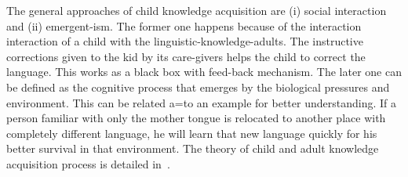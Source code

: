 \documentclass{bmcart}
\begin{document}
The general approaches of child knowledge acquisition are (i) social interaction and (ii) emergent-ism. The former one happens because of the interaction interaction of a child with the linguistic-knowledge-adults. The instructive corrections given to the kid by its care-givers helps the child to correct the language. This works as a black box with feed-back mechanism. The later one can be defined as the cognitive process that emerges by the biological pressures and environment. This can be related a=to an example for better understanding. If a person familiar with only the mother tongue is relocated to another place with completely different language, he will learn that new language quickly for his better survival in that environment. The theory of child and adult knowledge acquisition process is detailed in~\cite{childknowledge1}.
\end{document}
